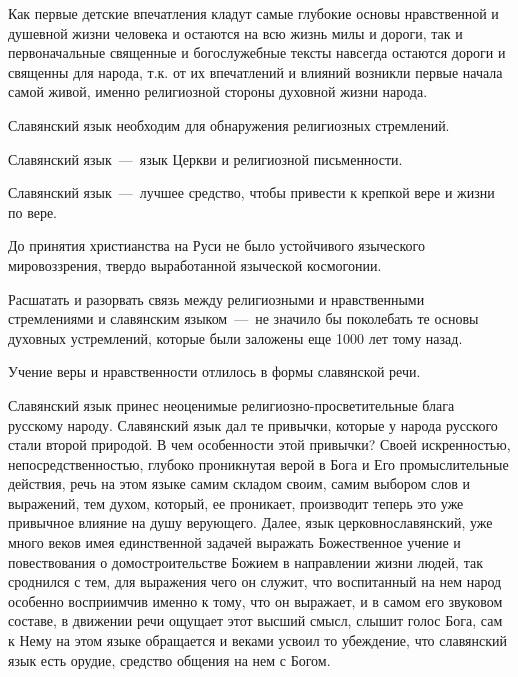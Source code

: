 \documentclass[11pt,a4paper,oneside]{memoir}
\begin{document}
    Как первые детские впечатления кладут самые глубокие основы нравственной и душевной жизни человека и остаются на всю жизнь милы и дороги, так и первоначальные священные и богослужебные тексты навсегда остаются дороги и священны для народа, т.к. от их впечатлений и влияний возникли первые начала самой живой, именно религиозной стороны духовной жизни народа.
    
    Славянский язык необходим для обнаружения религиозных стремлений.
    
    Славянский язык~---~язык Церкви и религиозной письменности.
    
    Славянский язык~---~лучшее средство, чтобы привести к крепкой вере и жизни по вере.
    
    До принятия христианства на Руси не было устойчивого языческого мировоззрения, твердо выработанной языческой космогонии.
    
    Расшатать и разорвать связь между религиозными и нравственными стремлениями и славянским языком~---~не значило бы поколебать те основы духовных устремлений, которые были заложены еще 1000 лет тому назад.
    
    Учение веры и нравственности отлилось в формы славянской речи.
    
    Славянский язык принес неоценимые религиозно-просветительные блага русскому народу. Славянский язык дал те привычки, которые у народа русского стали второй природой. В чем особенности этой привычки? Своей искренностью, непосредственностью, глубоко проникнутая верой в Бога и Его промыслительные действия, речь на этом языке самим складом своим, самим выбором слов и выражений, тем духом, который, ее проникает, производит теперь это уже привычное влияние на душу верующего. Далее, язык церковнославянский, уже много веков имея единственной задачей выражать Божественное учение и повествования о домостроительстве Божием в направлении жизни людей, так сроднился с тем, для выражения чего он служит, что воспитанный на нем народ особенно восприимчив именно к тому, что он выражает, и в самом его звуковом составе, в движении речи ощущает этот высший смысл, слышит голос Бога, сам к Нему на этом языке обращается и веками усвоил то убеждение, что славянский язык есть орудие, средство общения на нем с Богом.
    
\end{document}
